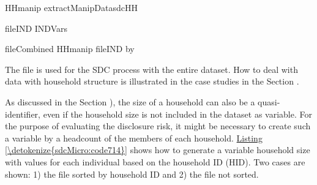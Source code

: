 \documentclass[letterpaper,10pt,english]{sphinxmanual}
\begin{document}
\def\sphinxLiteralBlockLabel{\label{\detokenize{sdcMicro:code713}}}
%
\begin{sphinxVerbatim}[commandchars=\\\{\},numbers=left,firstnumber=1,stepnumber=1]
HHmanip  extractManipDatasdcHH

fileIND  \PYG{p}{[}INDVars\PYG{p}{]}

fileCombined  HHmanip fileIND by  
\end{sphinxVerbatim}

The file  is used for the SDC process with the entire
dataset. How to deal with data with household structure is illustrated
in the case studies in the Section .

As discussed in the Section
),
the size of a household can also be a
quasi-identifier, even if the household size is not included in the
dataset as variable. For the purpose of evaluating the disclosure risk,
it might be necessary to create such a variable by a headcount of the
members of each household. \hyperref[\detokenize{sdcMicro:code714}]{Listing \ref{\detokenize{sdcMicro:code714}}} shows how to generate a variable
household size with values for each individual based on the household ID
(HID). Two cases are shown: 1) the file sorted by household ID and 2)
the file not sorted.
\end{document}
